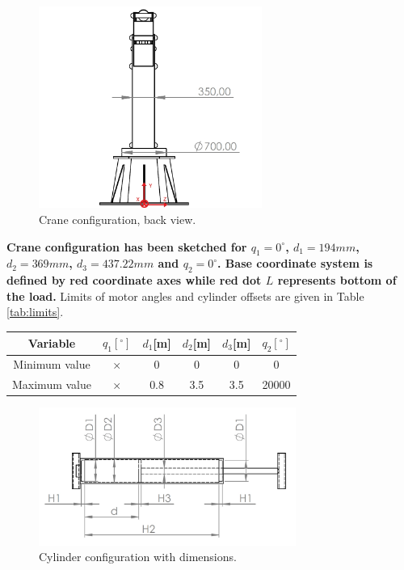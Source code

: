 \documentclass[openany]{book}
\begin{document}
	\begin{figure}[h!]
		\centering
		\includegraphics[width=0.65\textwidth]{kran_nacrt.jpg}
		\caption{Crane configuration, back view.}
		\label{fig:crane_back}
	\end{figure}
	
	\noindent
	\textbf{Crane configuration has been sketched for $q_1 = 0 ^\circ$, $d_1 = 
		194mm$, $d_2 = 369mm$, $d_3 = 437.22mm$ and $q_2 = 0 ^\circ$. Base 
		coordinate system is defined by red coordinate axes while red dot $L$ 
		represents bottom of the load.} Limits of motor angles and cylinder 
		offsets 
	are given in Table \ref{tab:limits}.
	
	\begin{center}
		\label{tab:limits}
		\begin{tabular}{|| c || c c c c c ||}
			\hline
			Variable & $q_1[^{\circ}]$ & $d_1$[m] & $d_2$[m] & $d_3$[m] &  
			$q_2[^{\circ}]$\\
			\hline\hline
			Minimum value & $\times$ & 0 & 0 & 0 & 0 \\ 
			\hline
			Maximum value & $\times$ & 0.8 & 3.5 & 3.5 & 20000 \\ 
			\hline
		\end{tabular}
	\end{center}
	
	\begin{figure}
		\centering
		\includegraphics[width=0.75\textwidth]{cilindar_shema.jpg}
		\caption{Cylinder configuration with dimensions.}
		\label{fig:cylinder_conf}
	\end{figure}
	
\end{document}
